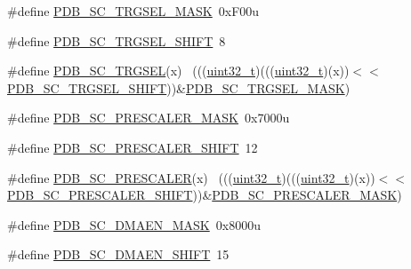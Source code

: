 \begin{DoxyCompactItemize}
\item 
\#define \hyperlink{group___p_d_b___register___masks_ga8950a99a799e9a49b602a679a64cc2e0}{P\+D\+B\+\_\+\+S\+C\+\_\+\+T\+R\+G\+S\+E\+L\+\_\+\+M\+A\+SK}~0x\+F00u
\item 
\#define \hyperlink{group___p_d_b___register___masks_gae206861ff2041634f913c44605459167}{P\+D\+B\+\_\+\+S\+C\+\_\+\+T\+R\+G\+S\+E\+L\+\_\+\+S\+H\+I\+FT}~8
\item 
\#define \hyperlink{group___p_d_b___register___masks_ga98d3539755a69c5db59982f6afc95163}{P\+D\+B\+\_\+\+S\+C\+\_\+\+T\+R\+G\+S\+EL}(x)                                              ~(((\hyperlink{_p_e___types_8h_a33594304e786b158f3fb30289278f5af}{uint32\+\_\+t})(((\hyperlink{_p_e___types_8h_a33594304e786b158f3fb30289278f5af}{uint32\+\_\+t})(x))$<$$<$\hyperlink{group___p_d_b___register___masks_gae206861ff2041634f913c44605459167}{P\+D\+B\+\_\+\+S\+C\+\_\+\+T\+R\+G\+S\+E\+L\+\_\+\+S\+H\+I\+FT}))\&\hyperlink{group___p_d_b___register___masks_ga8950a99a799e9a49b602a679a64cc2e0}{P\+D\+B\+\_\+\+S\+C\+\_\+\+T\+R\+G\+S\+E\+L\+\_\+\+M\+A\+SK})
\item 
\#define \hyperlink{group___p_d_b___register___masks_ga53e475cc672b4e976c7dccc10fe64d74}{P\+D\+B\+\_\+\+S\+C\+\_\+\+P\+R\+E\+S\+C\+A\+L\+E\+R\+\_\+\+M\+A\+SK}~0x7000u
\item 
\#define \hyperlink{group___p_d_b___register___masks_gae8062c54fb9d63becd95c6e34399b995}{P\+D\+B\+\_\+\+S\+C\+\_\+\+P\+R\+E\+S\+C\+A\+L\+E\+R\+\_\+\+S\+H\+I\+FT}~12
\item 
\#define \hyperlink{group___p_d_b___register___masks_gaf3190aabecbfc96a055a28d244939052}{P\+D\+B\+\_\+\+S\+C\+\_\+\+P\+R\+E\+S\+C\+A\+L\+ER}(x)                                        ~(((\hyperlink{_p_e___types_8h_a33594304e786b158f3fb30289278f5af}{uint32\+\_\+t})(((\hyperlink{_p_e___types_8h_a33594304e786b158f3fb30289278f5af}{uint32\+\_\+t})(x))$<$$<$\hyperlink{group___p_d_b___register___masks_gae8062c54fb9d63becd95c6e34399b995}{P\+D\+B\+\_\+\+S\+C\+\_\+\+P\+R\+E\+S\+C\+A\+L\+E\+R\+\_\+\+S\+H\+I\+FT}))\&\hyperlink{group___p_d_b___register___masks_ga53e475cc672b4e976c7dccc10fe64d74}{P\+D\+B\+\_\+\+S\+C\+\_\+\+P\+R\+E\+S\+C\+A\+L\+E\+R\+\_\+\+M\+A\+SK})
\item 
\#define \hyperlink{group___p_d_b___register___masks_gae2e04f313df4593c36890e463071fe5b}{P\+D\+B\+\_\+\+S\+C\+\_\+\+D\+M\+A\+E\+N\+\_\+\+M\+A\+SK}~0x8000u
\item 
\#define \hyperlink{group___p_d_b___register___masks_ga06b0f6651787dda98baf8953321b101b}{P\+D\+B\+\_\+\+S\+C\+\_\+\+D\+M\+A\+E\+N\+\_\+\+S\+H\+I\+FT}~15

\end{DoxyCompactItemize}
